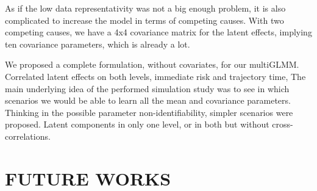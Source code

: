 As if the low data representativity was not a big enough problem, it is
also complicated to increase the model in terms of competing
causes. With two competing causes, we have a 4x4 covariance matrix for
the latent effects, implying ten covariance parameters, which is already
a lot.

We proposed a complete formulation, without covariates, for our
multiGLMM. Correlated latent effects on both levels, immediate risk and
trajectory time, The main underlying idea of the performed simulation
study was to see in which scenarios we would be able to learn all the
mean and covariance parameters. Thinking in the possible parameter
non-identifiability, simpler scenarios were proposed. Latent components
in only one level, or in both but without cross-correlations.

\section{FUTURE WORKS}
\label{cap:future}

